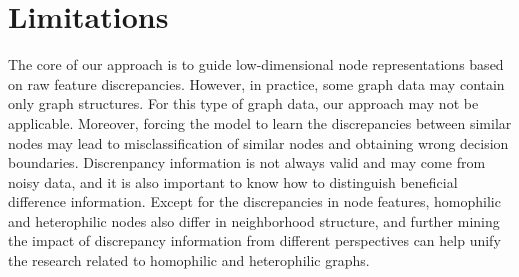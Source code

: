 \documentclass[sigconf]{acmart}
\begin{document}
\section{Limitations}
\label{limited}
The core of our approach is to guide low-dimensional node representations based on raw feature discrepancies. However, in practice, some graph data may contain only graph structures. For this type of graph data, our approach may not be applicable. Moreover, forcing the model to learn the discrepancies between similar nodes may lead to misclassification of similar nodes and obtaining wrong decision boundaries. Discrenpancy information is not always valid and may come from noisy data, and it is also important to know how to distinguish beneficial difference information. Except for the discrepancies in node features, homophilic and heterophilic nodes also differ in neighborhood structure, and further mining the impact of discrepancy information from different perspectives can help unify the research related to homophilic and heterophilic graphs.


\end{document}

